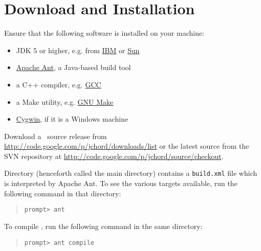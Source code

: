 \section{Download and Installation}
\label{sec:download-and-installation}

Ensure that the following software is installed on your machine:

\begin{itemize}
\item
JDK 5 or higher, e.g. from \href{http://www.ibm.com/developerworks/java/jdk/}{IBM} or
\href{http://java.sun.com/javase/downloads/index.jsp}{Sun}
\item
\href{http://ant.apache.org/}{Apache Ant}, a Java-based build tool
\item
a C++ compiler, e.g. \href{http://gcc.gnu.org/}{GCC}
\item
a Make utility, e.g. \href{http://www.gnu.org/software/make/}{GNU Make}
\item
\href{http://www.cygwin.com/}{Cygwin}, if it is a Windows machine
\end{itemize}

Download a \Chord\ source release from \url{http://code.google.com/p/jchord/downloads/list} or
the latest source from the SVN repository at \url{http://code.google.com/p/jchord/source/checkout}.

Directory  (henceforth called the main directory) contains a \verb+build.xml+
file which is interpreted by Apache Ant.
To see the various targets available, run the following command in that directory:

\begin{quote}
\begin{verbatim}
prompt> ant
\end{verbatim}
\end{quote}

To compile \Chord, run the following command in the same directory:

\begin{quote}
\begin{verbatim}
prompt> ant compile
\end{verbatim}
\end{quote}

